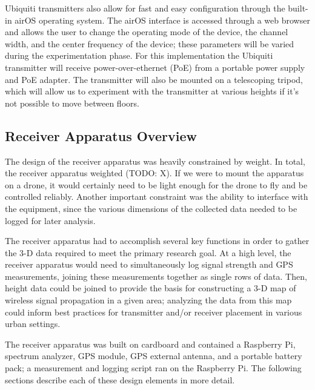 \documentclass[pageno]{jpaper}
\begin{document}
Ubiquiti transmitters also allow for fast and easy configuration through the built-in airOS operating system. The airOS interface is accessed through a web browser and allows the user to change the operating mode of the device, the channel width, and the center frequency of the device; these parameters will be varied during the experimentation phase. For this implementation the Ubiquiti transmitter will receive power-over-ethernet (PoE) from a portable power supply and PoE adapter. The transmitter will also be mounted on a telescoping tripod, which will allow us to experiment with the transmitter at various heights if it's not possible to move between floors.

\subsection{Receiver Apparatus Overview}
The design of the receiver apparatus was heavily constrained by weight. In total, the receiver apparatus weighted (TODO: X). If we were to mount the apparatus on a drone, it would certainly need to be light enough for the drone to fly and be controlled reliably. Another important constraint was the ability to interface with the equipment, since the various dimensions of the collected data needed to be logged for later analysis.

The receiver apparatus had to accomplish several key functions in order to gather the 3-D data required to meet the primary research goal. At a high level, the receiver apparatus would need to simultaneously log signal strength and GPS measurements, joining these measurements together as single rows of data. Then, height data could be joined to provide the basis for constructing a 3-D map of wireless signal propagation in a given area; analyzing the data from this map could inform best practices for transmitter and/or receiver placement in various urban settings.

The receiver apparatus was built on cardboard and contained a Raspberry Pi, spectrum analyzer, GPS module, GPS external antenna, and a portable battery pack; a measurement and logging script ran on the Raspberry Pi. The following sections describe each of these design elements in more detail.
\end{document}
